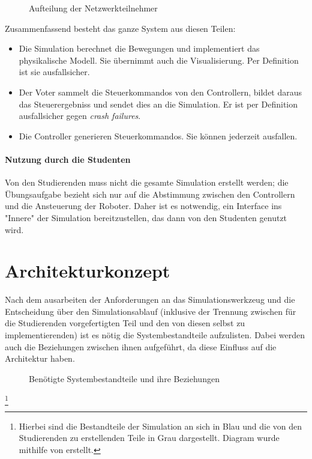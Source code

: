 \begin{figure}
	\centering
	\caption{Aufteilung der Netzwerkteilnehmer}
	\label{fig:network}
\end{figure}

Zusammenfassend besteht das ganze System aus diesen Teilen:
\begin{itemize}
	\item Die Simulation berechnet die Bewegungen und implementiert das physikalische Modell. Sie {\"{u}}bernimmt auch die Visualisierung. Per Definition ist sie ausfallsicher.
	\item Der Voter sammelt die Steuerkommandos von den Controllern, bildet daraus das Steuerergebniss und sendet dies an die Simulation. Er ist per Definition ausfallsicher gegen \textit{crash failures}.
	\item Die Controller generieren Steuerkommandos. Sie k{\"{o}}nnen jederzeit ausfallen.
\end{itemize}

\paragraph{Nutzung durch die Studenten} Von den Studierenden muss nicht die gesamte Simulation erstellt werden;
die {\"{U}}bungsaufgabe bezieht sich nur auf die Abstimmung zwischen den Controllern und die Ansteuerung der Roboter.
Daher ist es notwendig, ein Interface ins "Innere" der Simulation bereitzustellen, das dann von den Studenten genutzt wird.

\clearpage
\section{Architekturkonzept}
Nach dem ausarbeiten der Anforderungen an das Simulationswerkzeug und die Entscheidung {\"{u}}ber den Simulationsablauf (inklusive
der Trennung zwischen f{\"{u}}r die Studierenden vorgefertigten Teil und den von diesen selbst zu implementierenden) ist es n{\"{o}}tig
die Systembestandteile aufzulisten. Dabei werden auch die Beziehungen zwischen ihnen aufgef{\"{u}}hrt, da diese Einfluss auf die
Architektur haben.

\begin{figure}
	\centering
	\caption{Ben{\"{o}}tigte Systembestandteile und ihre Beziehungen}
	\label{fig:arch_pre}
\end{figure}
\footnote{Hierbei sind die Bestandteile der Simulation an sich in Blau und die von den Studierenden zu erstellenden Teile in Grau
dargestellt. Diagram wurde mithilfe von \cite{Hunter:2007} erstellt.}

